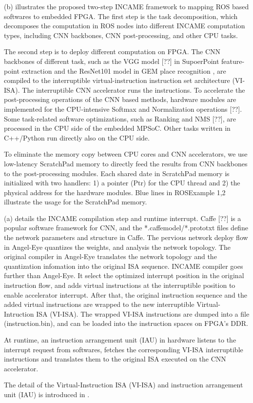 (b) illustrates the proposed two-step INCAME framework to mapping ROS based softwares to embedded FPGA.
The first step is the task decomposition, which decomposes the computation in ROS nodes into different INCAME computation types, including CNN backbones, CNN post-processing, and other CPU tasks. 

The second step is to deploy different computation on FPGA. 
The CNN backbones of  different task, such as the VGG model [??] in SupoerPoint feature-point extraction \cite{detone2018superpoint} and the ResNet101 model \cite{he2016deep} in GEM place recognition \cite{radenovic2018fine}, are compiled to the interruptible virtual-instruction instruction set architecture (VI-ISA). 
The interruptible CNN accelerator runs the instructions.
To accelerate the post-processing operations of the CNN based methods, hardware modules are implemented for the CPU-intensive Softmax and Normalization operations [??]. Some task-related software optimizations, such as Ranking and NMS [??], are processed in the CPU side of the embedded MPSoC\cite{MPSoC}.
Other tasks written in C++/Python run directly also on the CPU side.

To eliminate the memory copy between CPU cores and CNN accelerators, we use low-latency ScratchPad memory \cite{Banakar2002Scratchpad} to directly feed the results from CNN backbones to the post-processing modules. Each shared date in ScratchPad memory is initialized with two handlers: 1) a pointer (Ptr) for the CPU thread and 2) the physical address for the hardware modules. Blue lines in  ROSExample 1,2 illustrate the usage for the ScratchPad memory.

(a) details the INCAME compilation step and runtime interrupt. Caffe [??] is a popular software framework for CNN, and the *.caffemodel/*.prototxt files define the network parameters and structure in Caffe. The pervious network deploy flow in Angel-Eye \cite{guo2017angel} quantizes the weights, and analysis the network topology. The original compiler in Angel-Eye translates the network topology and the quantization infomation into the original ISA sequence. INCAME compiler goes further than Angel-Eye. It select the optimized interrupt position in the original instruction flow, and adds virtual instructions at the interruptible position to enable accelerator interrupt. After that, the original instruction sequence and the added virtual instructions are wrapped to the new interruptible Virtual-Intruction ISA (VI-ISA). The wrapped VI-ISA instructions are dumped into a file (instruction.bin), and can be loaded into the instruction spaces on FPGA's DDR.

At runtime, an instruction arrangement unit (IAU) in hardware listens to the interrupt request from softwares, fetches the corresponding VI-ISA interruptible instructions and translates them to the original ISA executed on the CNN accelerator. 

The detail of the Virtual-Instruction ISA (VI-ISA) and instruction arrangement unit (IAU) is introduced in .